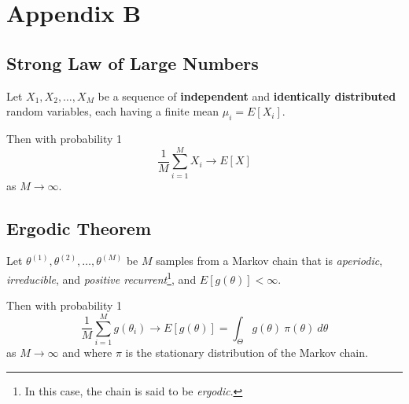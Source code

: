 \documentclass[11pt, oneside]{article}   	%
\begin{document}
\newpage
\section{Appendix B}
\label{appendix:b}

\subsection{Strong Law of Large Numbers}
\label{sec:slln}

Let $X_{1}, X_{2}, \hdots, X_{M}$ be a sequence of \textbf{independent} and \textbf{identically distributed} random variables, each having a finite mean $\mu_i = E[X_{i}]$. 

\bigskip
\noindent
Then with probability 1
\begin{equation}
\frac{1}{M}\sum\limits_{i=1}^{M} X_i \rightarrow E[X]
\end{equation}
as  $M \rightarrow \infty$.

\subsection{Ergodic Theorem}
\label{sec:ergodic}
Let $\theta^{(1)}, \theta^{(2)}, \hdots, \theta^{(M)}$ be $M$ samples from a Markov chain that is \emph{aperiodic}, \emph{irreducible}, and \emph{positive recurrent}\footnote{In this case, the chain is said to be \emph{ergodic}.}, and $E[g(\theta)] < \infty$.

\bigskip
\noindent
Then with probability 1
\begin{equation}
\frac{1}{M}\sum\limits_{i = 1}^{M} g(\theta_{i}) \rightarrow E[g(\theta)]  = \int_{\Theta}^{}g(\theta) \: \pi(\theta) \:d\theta
\end{equation}
as $M \rightarrow \infty$ and where $\pi$ is the stationary distribution of the Markov chain.


\newpage


\end{document}
